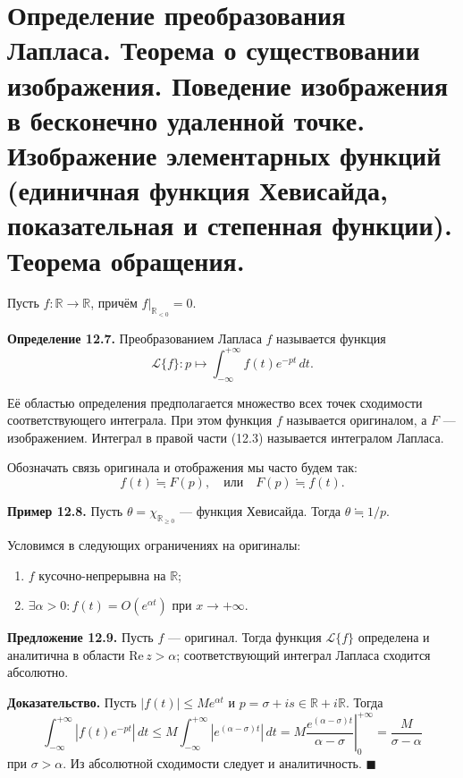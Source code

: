 \documentclass[12pt, a4paper]{article}
\theoremstyle{definition}
\theoremstyle{remark}
\begin{document}
\newpage
\section{Определение преобразования Лапласа. Теорема о существовании изображения. Поведение изображения в бесконечно удаленной точке. Изображение элементарных функций (единичная функция Хевисайда, показательная и степенная функции). Теорема обращения.}

Пусть $f : \mathbb{R} \to \mathbb{R}$, причём $f|_{\mathbb{R}_{<0}} = 0$.

\textbf{Определение 12.7.} Преобразованием Лапласа $f$ называется функция
\begin{equation}
	\mathcal{L}\{f\} : p \mapsto \int_{-\infty}^{+\infty} f(t) e^{-pt} \, dt.
\end{equation}

Её областью определения предполагается множество всех точек сходимости соответствующего интеграла. При этом функция $f$ называется оригиналом, а $F$ --- изображением. Интеграл в правой части (12.3) называется интегралом Лапласа.

\vspace{0.5em}
Обозначать связь оригинала и отображения мы часто будем так:
$$f(t) \fallingdotseq F(p), \quad \text{или} \quad F(p) \fallingdotseq f(t).$$

\textbf{Пример 12.8.} Пусть $\theta = \chi_{\mathbb{R}_{\ge0}}$ --- функция Хевисайда. Тогда $\theta \fallingdotseq 1/p$.

\vspace{0.5em}
Условимся в следующих ограничениях на оригиналы:
\begin{enumerate}
	\item $f$ кусочно-непрерывна на $\mathbb{R}$;
	\item $\exists \alpha > 0 : f(t) = O(e^{\alpha t})$ при $x \to +\infty$.
\end{enumerate}

\textbf{Предложение 12.9.} Пусть $f$ --- оригинал. Тогда функция $\mathcal{L}\{f\}$ определена и аналитична в области $\text{Re} \, z > \alpha$; соответствующий интеграл Лапласа сходится абсолютно.

\textbf{Доказательство.} Пусть $|f(t)| \le M e^{\alpha t}$ и $p = \sigma + is \in \mathbb{R} + i\mathbb{R}$. Тогда
\begin{equation}
	\int_{-\infty}^{+\infty} |f(t) e^{-pt}| \, dt \le M \int_{-\infty}^{+\infty} |e^{(\alpha - \sigma) t}| \, dt = M \left. \frac{e^{(\alpha - \sigma) t}}{\alpha - \sigma} \right|_{0}^{+\infty} = \frac{M}{\sigma - \alpha}
\end{equation}
при $\sigma > \alpha$. Из абсолютной сходимости следует и аналитичность. $\blacksquare$
\end{document}
